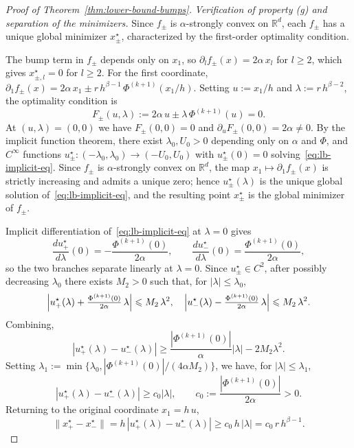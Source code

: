 \documentclass{article}
\renewcommand{\leq}{\leqslant}
\renewcommand{\geq}{\geqslant}
\theoremstyle{definition}
\begin{document}
\begin{proof}[Proof of Theorem~\ref{thm:lower-bound-bumps}]
\medskip
\noindent\textit{Verification of property (g) and separation of the minimizers.}
Since $f_\pm$ is $\alpha$-strongly convex on $\mathbb{R}^d$, each 
$f_\pm$ has a unique global minimizer $x_\pm^\star$, characterized 
by the first-order optimality condition.

The bump term in $f_\pm$ depends only on $x_1$, so 
$\partial_l f_\pm(x)=2\alpha\,x_l$ for $l\geq 2$, which gives 
$x_{\pm,l}^\star=0$ for $l\geq 2$. For the first coordinate, 
$\partial_1 f_\pm(x)=2\alpha\,x_1\pm r\,h^{\beta-1}\,
\Phi^{(k+1)}(x_1/h)$. Setting $u:=x_1/h$ and 
$\lambda:=r\,h^{\beta-2}$, the optimality condition is
\begin{equation}
\label{eq:lb-implicit-eq}
F_\pm(u,\lambda):=2\alpha\,u\pm\lambda\,\Phi^{(k+1)}(u)=0.
\end{equation}
At $(u,\lambda)=(0,0)$ we have $F_\pm(0,0)=0$ and 
$\partial_u F_\pm(0,0)=2\alpha\neq 0$. By the implicit function 
theorem, there exist $\lambda_0,U_0>0$ depending only on 
$\alpha$ and $\Phi$, and $C^\infty$ functions 
$u_\pm^\star:(-\lambda_0,\lambda_0)\to(-U_0,U_0)$ with 
$u_\pm^\star(0)=0$ solving~\eqref{eq:lb-implicit-eq}. Since 
$f_\pm$ is $\alpha$-strongly convex on $\mathbb{R}^d$, the map 
$x_1\mapsto\partial_1 f_\pm(x)$ is strictly increasing and admits 
a unique zero; hence $u_\pm^\star(\lambda)$ is the unique global 
solution of~\eqref{eq:lb-implicit-eq}, and the resulting point 
$x_\pm^\star$ is the global minimizer of $f_\pm$.

Implicit differentiation of~\eqref{eq:lb-implicit-eq} at 
$\lambda=0$ gives
\[
\frac{du_+^\star}{d\lambda}(0)=-\frac{\Phi^{(k+1)}(0)}{2\alpha},
\qquad
\frac{du_-^\star}{d\lambda}(0)=\frac{\Phi^{(k+1)}(0)}{2\alpha},
\]
so the two branches separate linearly at $\lambda=0$. Since 
$u_\pm^\star\in C^2$, after possibly decreasing $\lambda_0$ there 
exists $M_2>0$ such that, for $|\lambda|\leq\lambda_0$,
\[
\Bigl|u_+^\star(\lambda)+\tfrac{\Phi^{(k+1)}(0)}{2\alpha}\,\lambda
\Bigr|\leq M_2\,\lambda^2,
\quad
\Bigl|u_-^\star(\lambda)-\tfrac{\Phi^{(k+1)}(0)}{2\alpha}\,\lambda
\Bigr|\leq M_2\,\lambda^2.
\]
Combining,
\[
|u_+^\star(\lambda)-u_-^\star(\lambda)|
\geq\frac{|\Phi^{(k+1)}(0)|}{\alpha}|\lambda|-2M_2\lambda^2.
\]
Setting 
$\lambda_1:=\min\{\lambda_0,
|\Phi^{(k+1)}(0)|/(4\alpha M_2)\}$, we have, for 
$|\lambda|\leq\lambda_1$,
\begin{equation}
\label{eq:lb-u-sep}
|u_+^\star(\lambda)-u_-^\star(\lambda)|\geq c_0|\lambda|,
\qquad c_0:=\frac{|\Phi^{(k+1)}(0)|}{2\alpha}>0.
\end{equation}
Returning to the original coordinate $x_1=h\,u$,
\begin{equation}
\label{eq:lb-x-sep}
\|x_+^\star-x_-^\star\|
=h\,|u_+^\star(\lambda)-u_-^\star(\lambda)|
\geq c_0\,h\,|\lambda|=c_0\,r\,h^{\beta-1}.
\end{equation}


\end{proof}
\end{document}
